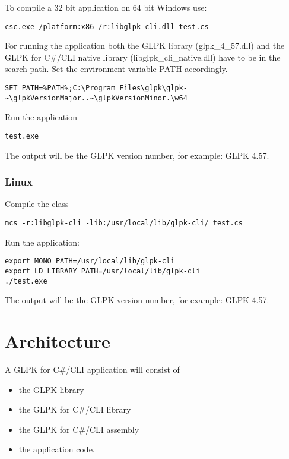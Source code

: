 \documentclass[a4paper,11pt]{report}
\newcommand{\glpkVersionMajor}{4}
\newcommand{\glpkVersionMinor}{57}
\begin{document}
To compile a 32 bit application on 64 bit Windows use:

\begin{lstlisting}
csc.exe /platform:x86 /r:libglpk-cli.dll test.cs
\end{lstlisting}

For running the application both the GLPK library
(glpk\_\glpkVersionMajor\_\glpkVersionMinor.dll) and the GLPK for C\#/CLI
native library (libglpk\_cli\_native.dll) have to be in the search path.
Set the environment variable PATH accordingly.

\begin{lstlisting}
SET PATH=%PATH%;C:\Program Files\glpk\glpk-~\glpkVersionMajor..~\glpkVersionMinor.\w64
\end{lstlisting}

Run the application

\begin{lstlisting}
test.exe
\end{lstlisting}

The output will be the GLPK version number, for example:
GLPK \glpkVersionMajor.\glpkVersionMinor.

\subsection{Linux}
Compile the class

\begin{lstlisting}
mcs -r:libglpk-cli -lib:/usr/local/lib/glpk-cli/ test.cs
\end{lstlisting}

Run the application:

\begin{lstlisting}
export MONO_PATH=/usr/local/lib/glpk-cli
export LD_LIBRARY_PATH=/usr/local/lib/glpk-cli
./test.exe
\end{lstlisting}

The output will be the GLPK version number, for example:
GLPK \glpkVersionMajor.\glpkVersionMinor.

\chapter{Architecture}
A GLPK for C\#/CLI application will consist of
\begin{itemize}
\item the GLPK library
\item the GLPK for C\#/CLI library
\item the GLPK for C\#/CLI assembly
\item the application code.
\end{itemize}
\end{document}
